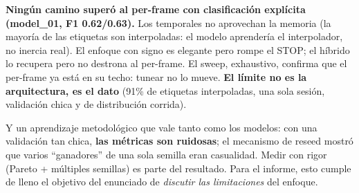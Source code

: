 \documentclass[11pt,a4paper]{article}
\begin{document}
\begin{nota}[Veredicto]
\textbf{Ningún camino superó al per-frame con clasificación explícita (model\_01, F1 0.62/0.63).} Los
temporales no aprovechan la memoria (la mayoría de las etiquetas son interpoladas: el modelo aprendería el
interpolador, no inercia real). El enfoque con signo es elegante pero rompe el STOP; el híbrido lo recupera
pero no destrona al per-frame. El sweep, exhaustivo, confirma que el per-frame ya está en su techo: tunear no
lo mueve. \textbf{El límite no es la arquitectura, es el dato} (91\% de etiquetas interpoladas, una sola
sesión, validación chica y de distribución corrida).
\end{nota}

Y un aprendizaje metodológico que vale tanto como los modelos: con una validación tan chica, \textbf{las
métricas son ruidosas}; el mecanismo de reseed mostró que varios ``ganadores'' de una sola semilla eran
casualidad. Medir con rigor (Pareto + múltiples semillas) es parte del resultado. Para el informe, esto cumple
de lleno el objetivo del enunciado de \emph{discutir las limitaciones} del enfoque.
\end{document}
